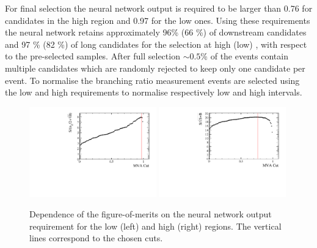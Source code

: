 For final selection the neural network output is required to be larger than 0.76 for candidates in the high \qsq region
and 0.97 for the low \qsq ones. Using these requirements the neural network retains approximately 96\% (66 \%)
of downstream candidates and 97 \% (82 \%) of long candidates for the selection at high (low) \qsq, with respect to
the pre-selected samples. After full selection $\sim 0.5$\% of the events contain multiple candidates
which are randomly rejected to keep only one candidate per event. 
%
%
To normalise the branching ratio measurement \jpsi events are selected using the low and high \qsq requirements
 to normalise respectively low and high \qsq intervals. 
%
\begin{figure}
\centering
\includegraphics[width=0.49\textwidth]{Lmumu/figs/Lmumu_lowQ2_FoM.pdf}
\includegraphics[width=0.49\textwidth]{Lmumu/figs/Lmumu_highQ2_FoM.pdf}
\caption{Dependence of the figure-of-merits on the neural network output requirement for the low \qsq
(left) and high \qsq (right) regions. The vertical lines correspond to the chosen cuts.}
\label{fig:Lb_FOM}
\end{figure}
%
